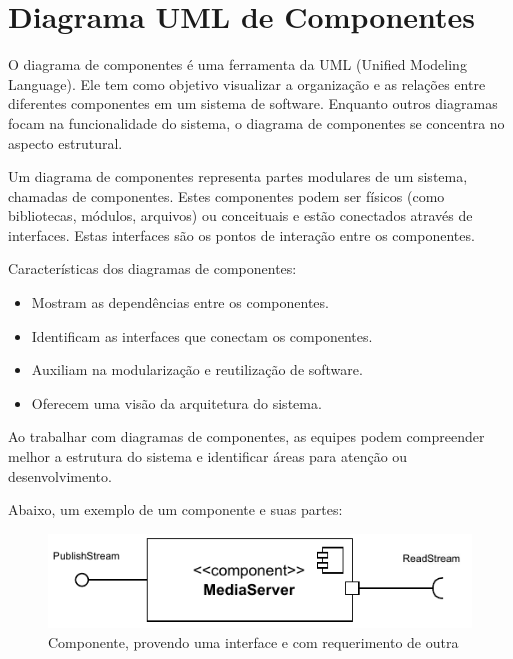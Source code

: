 \documentclass[12pt, %
openright, 
oneside, %
a4paper,    %
brazil]{facom-ufu-abntex2}
\begin{document}
\section{Diagrama UML de Componentes}

O diagrama de componentes é uma ferramenta da UML (Unified Modeling Language).
Ele tem como objetivo visualizar a organização e as relações entre diferentes
componentes em um sistema de software. Enquanto outros diagramas focam na
funcionalidade do sistema, o diagrama de componentes se concentra no aspecto
estrutural.

Um diagrama de componentes representa partes modulares de um sistema, chamadas
de componentes. Estes componentes podem ser físicos (como bibliotecas, módulos,
arquivos) ou conceituais e estão conectados através de interfaces. Estas
interfaces são os pontos de interação entre os componentes.

Características dos diagramas de componentes:
\begin{itemize}
	\item Mostram as dependências entre os componentes.
	\item Identificam as interfaces que conectam os componentes.
	\item Auxiliam na modularização e reutilização de software.
	\item Oferecem uma visão da arquitetura do sistema.
\end{itemize}

Ao trabalhar com diagramas de componentes, as equipes podem compreender melhor
a estrutura do sistema e identificar áreas para atenção ou desenvolvimento.

Abaixo, um exemplo de um componente e suas partes:


\begin{figure}[!ht]
	\centering
	\includegraphics[width=0.8\linewidth]{example_diagram.pdf}
	\caption[Componente de exemplo]{Componente, provendo uma interface e com requerimento de outra}
	\label{fig:graficosVariandoTamanhoRede}
\end{figure}
\end{document}

